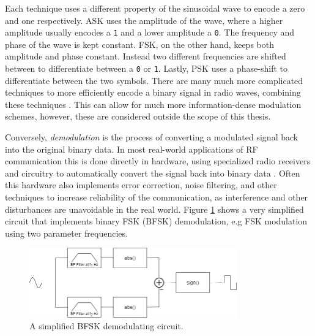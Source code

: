 Each technique uses a different property of the sinusoidal wave to encode a zero and one respectively. \gls{ASK} uses the amplitude of the wave, where a higher amplitude usually encodes a \texttt{1} and a lower amplitude a \texttt{0}. The frequency and phase of the wave is kept constant. \gls{FSK}, on the other hand, keeps both amplitude and phase constant. Instead two different frequencies are shifted between to differentiate between a \texttt{0} or \texttt{1}. Lastly, \gls{PSK} uses a phase-shift to differentiate between the two symbols. There are many much more complicated techniques to more efficiently encode a binary signal in radio waves, combining these techniques \cite{rf-modulation}. This can allow for much more information-dense modulation schemes, however, these are considered outside the scope of this thesis.

Conversely, \textit{demodulation} is the process of converting a modulated signal back into the original binary data. In most real-world applications of RF communication this is done directly in hardware, using specialized radio receivers and circuitry to automatically convert the signal back into binary data \cite{rf-modulation}. Often this hardware also implements error correction, noise filtering, and other techniques to increase reliability of the communication, as interference and other disturbances are unavoidable in the real world. Figure \ref{fig:bfsk-demodulator} shows a very simplified circuit that implements binary FSK (BFSK) demodulation, e.g FSK modulation using two parameter frequencies.
\begin{figure}[!ht]
    \centering
    \includegraphics[width=0.8\textwidth]{images/6-pentesting/bfsk-demodulator.png}
    \caption{A simplified BFSK demodulating circuit.}
    \label{fig:bfsk-demodulator}
\end{figure}

